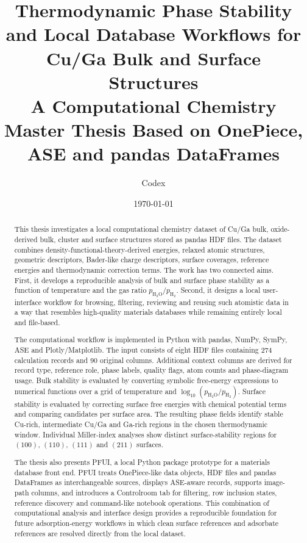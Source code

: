 \documentclass[12pt,a4paper,oneside]{report}
\title{
  \vspace{1.5cm}
  \textbf{Thermodynamic Phase Stability and Local Database Workflows for Cu/Ga Bulk and Surface Structures}\\[0.5cm]
  \large A Computational Chemistry Master Thesis Based on OnePiece, ASE and pandas DataFrames
}
\author{Codex}
\date{\today}
\begin{document}
\maketitle

\begin{abstract}
This thesis investigates a local computational chemistry dataset of Cu/Ga bulk,
oxide-derived bulk, cluster and surface structures stored as pandas HDF files.
The dataset combines density-functional-theory-derived energies, relaxed atomic
structures, geometric descriptors, Bader-like charge descriptors, surface
coverages, reference energies and thermodynamic correction terms. The work has
two connected aims. First, it develops a reproducible analysis of bulk and
surface phase stability as a function of temperature and the gas ratio
$p_{\mathrm{H_2O}}/p_{\mathrm{H_2}}$. Second, it designs a local user-interface
workflow for browsing, filtering, reviewing and reusing such atomistic data in
a way that resembles high-quality materials databases while remaining entirely
local and file-based.

The computational workflow is implemented in Python with pandas, NumPy, SymPy,
ASE and Plotly/Matplotlib. The input consists of eight HDF files containing 274
calculation records and 90 original columns. Additional context columns are
derived for record type, reference role, phase labels, quality flags, atom
counts and phase-diagram usage. Bulk stability is evaluated by converting
symbolic free-energy expressions to numerical functions over a grid of
temperature and $\log_{10}(p_{\mathrm{H_2O}}/p_{\mathrm{H_2}})$. Surface
stability is evaluated by correcting surface free energies with chemical
potential terms and comparing candidates per surface area. The resulting phase
fields identify stable Cu-rich, intermediate Cu/Ga and Ga-rich regions in the
chosen thermodynamic window. Individual Miller-index analyses show distinct
surface-stability regions for $(100)$, $(110)$, $(111)$ and $(211)$ surfaces.

The thesis also presents PFUI, a local Python package prototype for a materials
database front end. PFUI treats OnePiece-like data objects, HDF files and
pandas DataFrames as interchangeable sources, displays ASE-aware records,
supports image-path columns, and introduces a Controlroom tab for filtering,
row inclusion states, reference discovery and command-like notebook operations.
This combination of computational analysis and interface design provides a
reproducible foundation for future adsorption-energy workflows in which clean
surface references and adsorbate references are resolved directly from the
local dataset.
\end{abstract}
\end{document}
